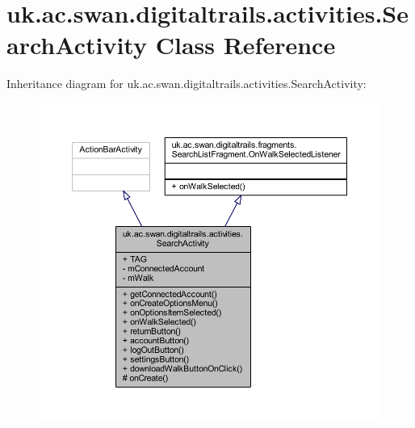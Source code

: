 \hypertarget{classuk_1_1ac_1_1swan_1_1digitaltrails_1_1activities_1_1_search_activity}{\section{uk.\+ac.\+swan.\+digitaltrails.\+activities.\+Search\+Activity Class Reference}
\label{classuk_1_1ac_1_1swan_1_1digitaltrails_1_1activities_1_1_search_activity}
}


Inheritance diagram for uk.\+ac.\+swan.\+digitaltrails.\+activities.\+Search\+Activity\+:
\nopagebreak
\begin{figure}[H]
\begin{center}
\leavevmode
\includegraphics[width=350pt]{classuk_1_1ac_1_1swan_1_1digitaltrails_1_1activities_1_1_search_activity__inherit__graph}
\end{center}
\end{figure}


